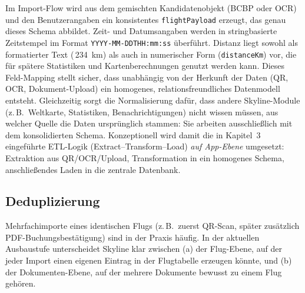 Im Import-Flow wird aus dem gemischten Kandidatenobjekt (BCBP oder OCR) und den Benutzerangaben ein konsistentes \texttt{flightPayload} erzeugt, das genau dieses Schema abbildet.
Zeit- und Datumsangaben werden in stringbasierte Zeitstempel im Format \texttt{YYYY-MM-DDTHH:mm:ss} überführt.
Distanz liegt sowohl als formatierter Text (\,234~km\grqq) als auch in numerischer Form (\texttt{distanceKm}) vor, die für spätere Statistiken und Kartenberechnungen genutzt werden kann.
Dieses Feld-Mapping stellt sicher, dass unabhängig von der Herkunft der Daten (QR, OCR, Dokument-Upload) ein homogenes, relationsfreundliches Datenmodell entsteht.
Gleichzeitig sorgt die Normalisierung dafür, dass andere Skyline-Module (z.\,B.\ Weltkarte, Statistiken, Benachrichtigungen) nicht wissen müssen, aus welcher Quelle die Daten ursprünglich stammen:
Sie arbeiten ausschließlich mit dem konsolidierten Schema.
Konzeptionell wird damit die in Kapitel~3 eingeführte ETL-Logik (Extract--Transform--Load) \emph{auf App-Ebene} umgesetzt: Extraktion aus QR/OCR/Upload, Transformation in ein homogenes Schema, anschließendes Laden in die zentrale Datenbank.

\subsection{Deduplizierung}

Mehrfachimporte eines identischen Flugs (z.\,B.\ zuerst QR-Scan, später zusätzlich PDF-Buchungsbestätigung) sind in der Praxis häufig.
In der aktuellen Ausbaustufe unterscheidet Skyline klar zwischen
(a) der Flug-Ebene, auf der jeder Import einen eigenen Eintrag in der Flugtabelle erzeugen könnte, und
(b) der Dokumenten-Ebene, auf der mehrere Dokumente bewusst zu einem Flug gehören.

